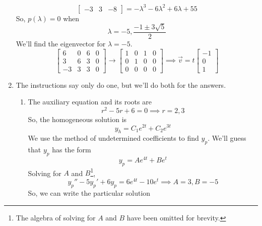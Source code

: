 \begin{enumerate}[label=\arabic*.]
\begin{equation*}
\begin{bmatrix}
				-3 & 3 & -8
			\end{bmatrix} = -\lambda^3 - 6\lambda^2 + 6\lambda + 55
		\end{equation*}
		So, $p(\lambda) = 0$ when
		\begin{equation*}
			\lambda = -5, \frac{-1 \pm 3\sqrt{5}}{2}
		\end{equation*}
		We'll find the eigenvector for $\lambda = -5$.
		\begin{equation*}
			\left[
				\begin{array}{ccc|c}
					6 & 0 & 6 & 0\\
					3 & 6 & 3 & 0\\
					-3 & 3 & 3 & 0
				\end{array}
			\right] \to \left[
				\begin{array}{ccc|c}
					1 & 0 & 1 & 0 \\
					0 & 1 & 0 & 0 \\
					0 & 0 & 0 & 0
				\end{array}
			\right] \implies \vec{v} = t\begin{bmatrix}
				-1 \\
				0 \\
				1
			\end{bmatrix}
		\end{equation*}
	\item
		The instructions say only do one, but we'll do both for the answers.
		\begin{enumerate}[label=(\alph*)]
			\item
				The auxiliary equation and its roots are
				\begin{equation*}
					r^2 - 5r + 6 = 0 \implies r = 2, 3
				\end{equation*}
				So, the homogeneous solution is
				\begin{equation*}
					y_h = C_1e^{2t} + C_2e^{3t}
				\end{equation*}
				We use the method of undetermined coefficients to find $y_p$. We'll guess that $y_p$ has the form
				\begin{equation*}
					y_p = Ae^{4t} + Be^{t}
				\end{equation*}
				Solving for $A$ and $B$\footnote{The algebra of solving for $A$ and $B$ have been omitted for brevity.},
				\begin{equation*}
					y_p'' - 5y_p' + 6y_p = 6e^{4t} - 10e^t \implies A = 3, B = -5
				\end{equation*}
				So, we can write the particular solution
				\begin{equation*}

\end{equation*}
\end{enumerate}
\end{enumerate}
